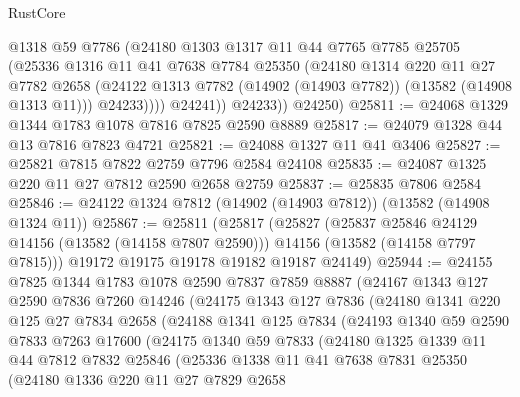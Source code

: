 \begin{lexlean}{RustCore}
\begin{coremodule}
                @1318
                @59
                @7786
                (@24180
                  @1303
                  @1317
                  @11
                  @44
                  @7765
                  @7785
                  @25705
                  (@25336
                    @1316
                    @11
                    @41
                    @7638
                    @7784
                    @25350
                    (@24180
                      @1314
                      @220
                      @11
                      @27
                      @7782
                      @2658
                      (@24122 @1313 @7782 (@14902 (@14903 @7782)) (@13582 (@14908 @1313 @11)))
                      @24233))))
              @24241))
          @24233))
      @24250)
@25811 := @24068 @1329 @1344 @1783 @1078 @7816 @7825 @2590 @8889
@25817 := @24079 @1328 @44 @13 @7816 @7823 @4721
@25821 := @24088 @1327 @11 @41 @3406
@25827 := @25821 @7815 @7822 @2759 @7796 @2584 @24108
@25835 := @24087 @1325 @220 @11 @27 @7812 @2590 @2658 @2759
@25837 := @25835 @7806 @2584
@25846 := @24122 @1324 @7812 (@14902 (@14903 @7812)) (@13582 (@14908 @1324 @11))
@25867 := @25811
    (@25817
      (@25827
        (@25837 @25846 @24129 @14156 (@13582 (@14158 @7807 @2590)))
        @14156
        (@13582 (@14158 @7797 @7815)))
      @19172
      @19175
      @19178
      @19182
      @19187
      @24149)
@25944 := @24155
    @7825
    @1344
    @1783
    @1078
    @2590
    @7837
    @7859
    @8887
    (@24167
      @1343
      @127
      @2590
      @7836
      @7260
      @14246
      (@24175
        @1343
        @127
        @7836
        (@24180
          @1341
          @220
          @125
          @27
          @7834
          @2658
          (@24188
            @1341
            @125
            @7834
            (@24193
              @1340
              @59
              @2590
              @7833
              @7263
              @17600
              (@24175
                @1340
                @59
                @7833
                (@24180
                  @1325
                  @1339
                  @11
                  @44
                  @7812
                  @7832
                  @25846
                  (@25336
                    @1338
                    @11
                    @41
                    @7638
                    @7831
                    @25350
                    (@24180
                      @1336
                      @220
                      @11
                      @27
                      @7829
                      @2658

\end{coremodule}
\end{lexlean}

